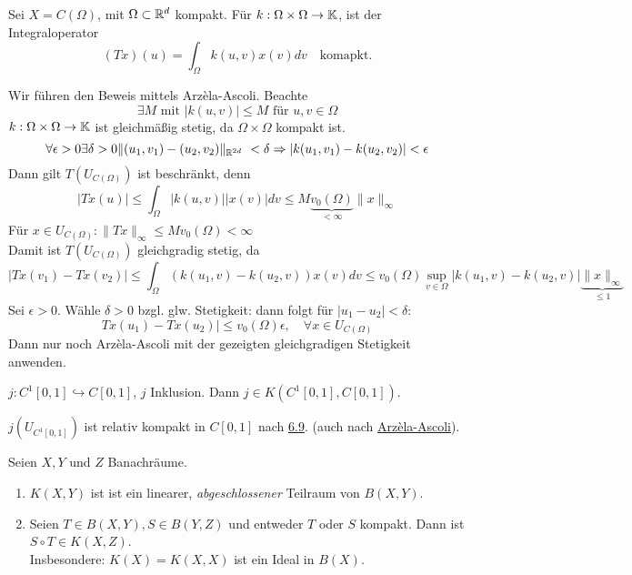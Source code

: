 \begin{beispiel} \label{bsp:7.3}
	Sei $X = C(\Omega)$, mit $\Omega \subset \mathbb{R}^{d}$ kompakt. Für $k : \Omega \times \Omega \rightarrow \mathbb{K}$, ist der Integraloperator
	\[ (Tx)(u) = \int_{\Omega} k(u, v) x(v) dv \quad \text{komapkt.} \]
	\begin{beweis}
		Wir führen den Beweis mittels Arzèla-Ascoli. Beachte
		\[ \exists M \text{ mit } |k(u, v)| \leq M \text{ für } u, v \in \Omega \]
		$k : \Omega \times \Omega \rightarrow \mathbb{K}$ ist gleichmä{\ss}ig stetig, da $\Omega \times \Omega$ kompakt ist.
		\[ \forall \epsilon > 0 \exists \delta > 0 \| (u_1, v_1) - (u_2, v_2) \|_{\MdR^{2d}} < \delta \Rightarrow |k(u_1, v_1) - k(u_2, v_2)| < \epsilon \]
		Dann gilt $T(U_{C(\Omega)})$ ist beschränkt, denn
		\[ |Tx(u)| \leq \int_{\Omega} |k(u, v)| |x(v)| dv \leq M \underbrace{v_{0}(\Omega)}_{< \infty} \| x \|_{\infty} \]
		Für $x \in U_{C(\Omega)}: \| Tx \|_{\infty} \leq M v_{0}(\Omega) < \infty$ \\
		Damit ist $T(U_{C(\Omega)})$ gleichgradig stetig, da
		\[ |Tx(v_1) - Tx(v_2)| \leq \int_{\Omega} \left( k(u_1, v) - k(u_2, v) \right) x(v) dv \leq v_{0}(\Omega) \sup_{v \in \Omega} | k(u_1, v) - k(u_2, v) | \underbrace{\| x \|_{\infty}}_{ \leq 1 } \]
		Sei $\epsilon > 0$. Wähle $\delta > 0$ bzgl. glw. Stetigkeit: dann folgt für 	$|u_1 - u_2| < \delta$:
		\[ Tx(u_1) - Tx(u_2) | \leq v_{0}(\Omega) \epsilon, \quad \forall x \in U_{C(\Omega)} \]
		Dann nur noch Arzèla-Ascoli mit der gezeigten gleichgradigen Stetigkeit anwenden.
	\end{beweis}
\end{beispiel}

\begin{beispiel} \label{bsp:7.4}
	$j : C^{1}[0, 1] \hookrightarrow C[0, 1]$, $j$ Inklusion. Dann $j \in K(C^{1}[0, 1], C[0, 1])$.
	\begin{beweis}
		$j(U_{C^{1}[0, 1]})$ ist relativ kompakt in $C[0, 1]$ nach \hyperref[]{6.9}. (auch nach \hyperref[satz-6.7-arzelaascoli]{Arzèla-Ascoli}).
	\end{beweis}
\end{beispiel}

\begin{satz} \label{satz:7-5}
	Seien $X, Y$ und $Z$ Banachräume.
	\begin{enumerate}[label=\alph*\upshape)]
		\label{satz:7-5a}
		\item $K(X, Y)$ ist ist ein linearer, \textit{abgeschlossener} Teilraum von $B(X, Y)$.
		\item Seien $T \in B(X, Y), S \in B(Y, Z)$ und entweder $T$ oder $S$ kompakt. Dann ist $S \circ T \in K(X, Z)$. \\
			Insbesondere: $K(X) = K(X, X)$ ist ein Ideal in $B(X)$.
	\end{enumerate}
\end{satz}


